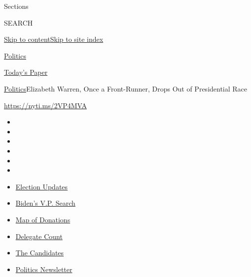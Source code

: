 Sections

SEARCH

\protect\hyperlink{site-content}{Skip to
content}\protect\hyperlink{site-index}{Skip to site index}

\href{https://www.nytimes.com/section/politics}{Politics}

\href{https://myaccount.nytimes.com/auth/login?response_type=cookie\&client_id=vi}{}

\href{https://www.nytimes.com/section/todayspaper}{Today's Paper}

\href{/section/politics}{Politics}\textbar{}Elizabeth Warren, Once a
Front-Runner, Drops Out of Presidential Race

\url{https://nyti.ms/2VP4MVA}

\begin{itemize}
\item
\item
\item
\item
\item
\item
\end{itemize}

\begin{itemize}
\item
  \href{https://www.nytimes.com/2020/07/31/us/elections/biden-vs-trump.html?action=click\&pgtype=Article\&state=default\&region=TOP_BANNER\&context=storylines_menu}{Election
  Updates}
\item
  \href{https://www.nytimes.com/article/biden-vice-president-2020.html?action=click\&pgtype=Article\&state=default\&region=TOP_BANNER\&context=storylines_menu}{Biden's
  V.P. Search}
\item
  \href{https://www.nytimes.com/interactive/2020/07/24/us/politics/trump-biden-campaign-donors.html?action=click\&pgtype=Article\&state=default\&region=TOP_BANNER\&context=storylines_menu}{Map
  of Donations}
\item
  \href{https://www.nytimes.com/interactive/2020/us/elections/delegate-count-primary-results.html?action=click\&pgtype=Article\&state=default\&region=TOP_BANNER\&context=storylines_menu}{Delegate
  Count}
\item
  \href{https://www.nytimes.com/interactive/2019/us/politics/2020-presidential-candidates.html?action=click\&pgtype=Article\&state=default\&region=TOP_BANNER\&context=storylines_menu}{The
  Candidates}
\item
  \href{https://www.nytimes.com/newsletters/politics?action=click\&pgtype=Article\&state=default\&region=TOP_BANNER\&context=storylines_menu}{Politics
  Newsletter}
\end{itemize}

